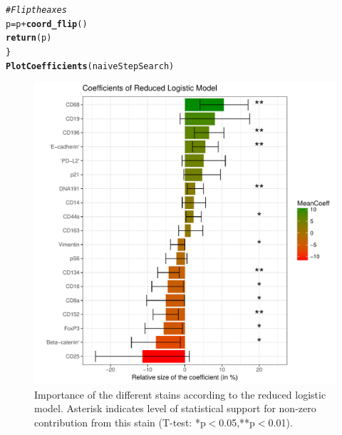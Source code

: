 \documentclass[a4paper]{article}\usepackage[]{graphicx}\usepackage[]{color}
\makeatletter
\def\maxwidth{ %
  \ifdim\Gin@nat@width>\linewidth
    \linewidth
  \else
    \Gin@nat@width
  \fi
}
\newcommand{\hlcom}[1]{\textcolor[rgb]{0.678,0.584,0.686}{\textit{#1}}}%
\newcommand{\hlopt}[1]{\textcolor[rgb]{0,0,0}{#1}}%
\newcommand{\hlstd}[1]{\textcolor[rgb]{0.345,0.345,0.345}{#1}}%
\newcommand{\hlkwb}[1]{\textcolor[rgb]{0.69,0.353,0.396}{#1}}%
\newcommand{\hlkwd}[1]{\textcolor[rgb]{0.737,0.353,0.396}{\textbf{#1}}}%
\newenvironment{kframe}{%
 \def\at@end@of@kframe{}%
 \ifinner\ifhmode%
  \def\at@end@of@kframe{\end{minipage}}%
  \begin{minipage}{\columnwidth}%
 \fi\fi%
 \def\FrameCommand##1{\hskip\@totalleftmargin \hskip-\fboxsep
 \colorbox{shadecolor}{##1}\hskip-\fboxsep
     \hskip-\linewidth \hskip-\@totalleftmargin \hskip\columnwidth}%
 \MakeFramed {\advance\hsize-\width
   \@totalleftmargin\z@ \linewidth\hsize
   \@setminipage}}%
 {\par\unskip\endMakeFramed%
 \at@end@of@kframe}
\newenvironment{knitrout}{}{} %
\makeatother
\begin{document}
\begin{knitrout}
\begin{kframe}
\begin{alltt}
  \hlcom{# Flip the axes}
  \hlstd{p} \hlkwb{=} \hlstd{p} \hlopt{+} \hlkwd{coord_flip}\hlstd{()}
  \hlkwd{return}\hlstd{(p)}
\hlstd{\}}
\hlkwd{PlotCoefficients}\hlstd{(naiveStepSearch)}
\end{alltt}
\end{kframe}\begin{figure}[t]
\includegraphics[width=\maxwidth]{figure/Fig_redModCoeff-1} \caption[Importance of the different stains according to the reduced logistic model]{Importance of the different stains according to the reduced logistic model. Asterisk indicates level of statistical support for non-zero contribution from this stain (T-test: *p$<$0.05,**p$<$0.01).}\label{fig:Fig_redModCoeff}
\end{figure}


\end{knitrout}
\end{document}

